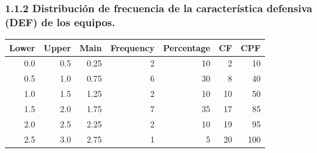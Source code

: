 \documentclass[]{article}
\newenvironment{Shaded}{\begin{snugshade}}{\end{snugshade}}
\newcommand{\CommentTok}[1]{\textcolor[rgb]{0.56,0.35,0.01}{\textit{#1}}}
\newcommand{\DataTypeTok}[1]{\textcolor[rgb]{0.13,0.29,0.53}{#1}}
\newcommand{\KeywordTok}[1]{\textcolor[rgb]{0.13,0.29,0.53}{\textbf{#1}}}
\newcommand{\NormalTok}[1]{#1}
\newcommand{\OperatorTok}[1]{\textcolor[rgb]{0.81,0.36,0.00}{\textbf{#1}}}
\newcommand{\OtherTok}[1]{\textcolor[rgb]{0.56,0.35,0.01}{#1}}
\newcommand{\StringTok}[1]{\textcolor[rgb]{0.31,0.60,0.02}{#1}}
\begin{document}
\hypertarget{distribucion-de-frecuencia-de-la-caracteristica-defensiva-def-de-los-equipos.}{%
\subsubsection{1.1.2 Distribución de frecuencia de la característica
defensiva (DEF) de los
equipos.}\label{distribucion-de-frecuencia-de-la-caracteristica-defensiva-def-de-los-equipos.}}

\begin{Shaded}
\end{Shaded}

\begin{table}[H]
\centering
\begin{tabular}{r|r|r|r|r|r|r}
\hline
Lower & Upper & Main & Frequency & Percentage & CF & CPF\\
\hline
\rowcolor{gray!6}  0.0 & 0.5 & 0.25 & 2 & 10 & 2 & 10\\
\hline
0.5 & 1.0 & 0.75 & 6 & 30 & 8 & 40\\
\hline
\rowcolor{gray!6}  1.0 & 1.5 & 1.25 & 2 & 10 & 10 & 50\\
\hline
1.5 & 2.0 & 1.75 & 7 & 35 & 17 & 85\\
\hline
\rowcolor{gray!6}  2.0 & 2.5 & 2.25 & 2 & 10 & 19 & 95\\
\hline
2.5 & 3.0 & 2.75 & 1 & 5 & 20 & 100\\
\hline
\end{tabular}
\end{table}
\end{document}
